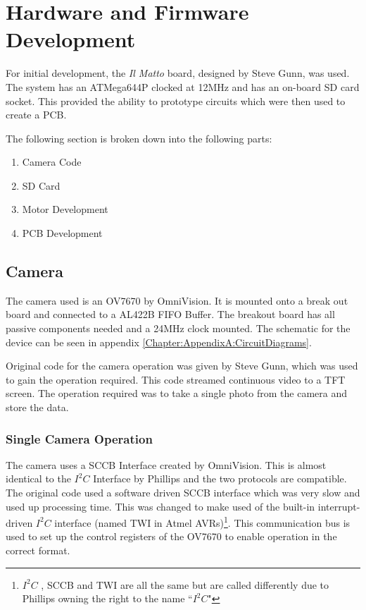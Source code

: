 \chapter{Hardware and Firmware Development} \label{Chapter:HardwareDevelopment}
For initial development, the \textit{Il Matto} board, designed by Steve Gunn, was used. The system has an ATMega644P clocked at 12MHz and has an on-board SD card socket. This provided the ability to prototype circuits which were then used to create a PCB.

The following section is broken down into the following parts:
\begin{enumerate}
\item[\ref{Section:Camera}] Camera Code
\item[\ref{sect:SDCard}] SD Card
\item[\ref{Section:Motor_Dev}] Motor Development
\item[\ref{Section:PCB_Dev}] PCB Development
\end{enumerate}

\section{Camera} \label{Section:Camera}

The camera used is an OV7670 by OmniVision. It is mounted onto a break out board and connected to a AL422B FIFO Buffer. The breakout board has all passive components needed and a 24MHz clock mounted. The schematic for the device can be seen in appendix \ref{Chapter:AppendixA:CircuitDiagrams}.

Original code for the camera operation was given by Steve Gunn, which was used to gain the operation required. This code streamed continuous video to a TFT screen. The operation required was to take a single photo from the camera and store the data. 

\subsection{Single Camera Operation}

The camera uses a SCCB Interface \citep{SCCB_Interface} created by OmniVision. This is almost identical to the $I^{2}C$ Interface by Phillips and the two protocols are compatible. The original code used a software driven SCCB interface which was very slow and used up processing time. This was changed to make used of the built-in interrupt-driven $I^{2}C$ interface (named TWI in Atmel AVRs)\footnote{$I^{2}C$ , SCCB and TWI are all the same but are called differently due to Phillips owning the right to the name ``$I^{2}C$"}. This communication bus is used to set up the control registers of the OV7670 to enable operation in the correct format. 

